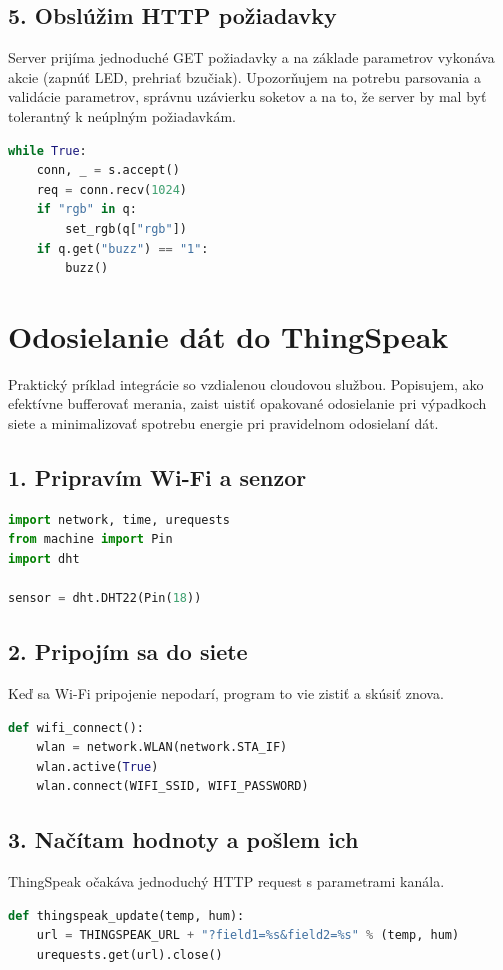 \subsection*{5. Obslúžim HTTP požiadavky}
Server prijíma jednoduché GET požiadavky a na základe parametrov vykonáva akcie (zapnúť LED, prehriať bzučiak). Upozorňujem na potrebu parsovania a validácie parametrov, správnu uzávierku soketov a na to, že server by mal byť tolerantný k neúplným požiadavkám.
\begin{lstlisting}[language=Python]
while True:
	conn, _ = s.accept()
	req = conn.recv(1024)
	if "rgb" in q:
		set_rgb(q["rgb"])
	if q.get("buzz") == "1":
		buzz()
\end{lstlisting}

\clearpage
\section{Odosielanie dát do ThingSpeak}
Praktický príklad integrácie so vzdialenou cloudovou službou. Popisujem, ako efektívne bufferovať merania, zaist uistiť opakované odosielanie pri výpadkoch siete a minimalizovať spotrebu energie pri pravidelnom odosielaní dát.

\subsection*{1. Pripravím Wi-Fi a senzor}
\begin{lstlisting}[language=Python]
import network, time, urequests
from machine import Pin
import dht

sensor = dht.DHT22(Pin(18))
\end{lstlisting}

\subsection*{2. Pripojím sa do siete}
Keď sa Wi-Fi pripojenie nepodarí, program to vie zistiť a skúsiť znova.
\begin{lstlisting}[language=Python]
def wifi_connect():
	wlan = network.WLAN(network.STA_IF)
	wlan.active(True)
	wlan.connect(WIFI_SSID, WIFI_PASSWORD)
\end{lstlisting}

\subsection*{3. Načítam hodnoty a pošlem ich}
ThingSpeak očakáva jednoduchý HTTP request s parametrami kanála.
\begin{lstlisting}[language=Python]
def thingspeak_update(temp, hum):
	url = THINGSPEAK_URL + "?field1=%s&field2=%s" % (temp, hum)
	urequests.get(url).close()
\end{lstlisting}


